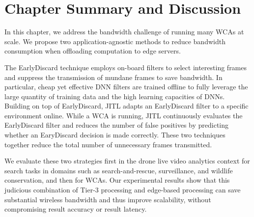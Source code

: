 \section{Chapter Summary and Discussion}
\label{bw:discussion}

In this chapter, we address the bandwidth challenge of running many WCAs at
scale. We propose two application-agnostic methods to reduce bandwidth
consumption when offloading computation to edge servers.

The EarlyDiscard technique employs on-board filters to select interesting frames
and suppress the transmission of mundane frames to save bandwidth. In
particular, cheap yet effective DNN filters are trained offline to fully
leverage the large quantity of training data and the high learning capacities of
DNNs. Building on top of EarlyDiscard, JITL adapts an EarlyDiscard filter to a
specific environment online. While a WCA is running, JITL continuously evaluates
the EarlyDiscard filter and reduces the number of false positives by predicting
whether an EaryDiscard decision is made correctly. These two techniques together
reduce the total number of unnecessary frames transmitted.

We evaluate these two strategies first in the drone live video analytics context
for search tasks in domains such as search-and-rescue, surveillance, and
wildlife conservation, and then for WCAs. Our experimental results show that
this judicious combination of Tier-3 processing and edge-based processing can
save substantial wireless bandwidth and thus improve scalability, without
compromising result accuracy or result latency.